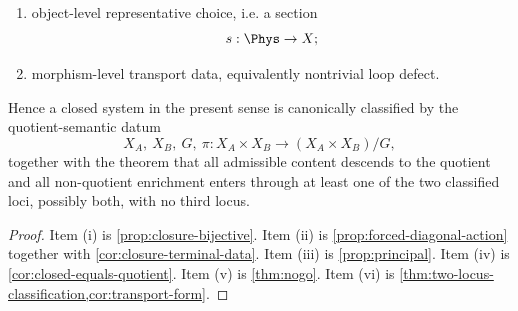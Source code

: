 \begin{theorem}
\begin{enumerate}[label=\textup{(\roman*)}]
\begin{enumerate}[label=\textup{(\alph*)}]
			      \item object-level representative choice, i.e. a section
			            \[
				            s:\Phys\to X;
			            \]
			      \item morphism-level transport data, equivalently nontrivial loop defect.
		      \end{enumerate}
		\end{enumerate}
		Hence a closed system in the present sense is canonically classified by
		the quotient-semantic datum
		\[
			X_A,\ X_B,\ G,\ \pi:X_A\times X_B\to (X_A\times X_B)/G,
		\]
		together with the theorem that all admissible content descends to the
		quotient and all non-quotient enrichment enters through at least one of
		the two classified loci, possibly both, with no third locus.
\end{theorem}
\begin{proof}
	Item \textup{(i)} is \cref{prop:closure-bijective}. Item \textup{(ii)}
	is \cref{prop:forced-diagonal-action} together with
	\cref{cor:closure-terminal-data}. Item \textup{(iii)} is
	\cref{prop:principal}. Item \textup{(iv)} is
	\cref{cor:closed-equals-quotient}. Item \textup{(v)} is
	\cref{thm:nogo}. Item \textup{(vi)} is
	\cref{thm:two-locus-classification,cor:transport-form}.
\end{proof}
